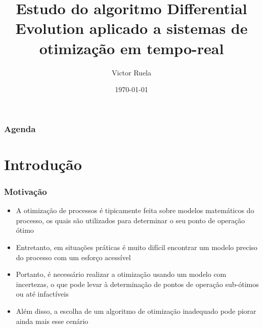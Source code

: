 \documentclass{beamer}
\title[Computação Evolucionária 2020/1]{Estudo do algoritmo Differential Evolution aplicado a sistemas de otimização em tempo-real} %
\author{Victor Ruela} %
\institute[PPGEE - UFMG] %
{
Programa de Pós-Graduação em Engenharia Elétrica\\ Universidade Federal de Minas Gerais \\ %
\medskip
\textit{victorspruela@ufmg.br} %
}
\date{\today} %
\begin{document}
\begin{frame}
\titlepage %
\end{frame}

\begin{frame}
\frametitle{Agenda} %
\tableofcontents %
\end{frame}


\section{Introdução} %


\begin{frame}
	\frametitle{Motivação}
	\begin{itemize}
		\item A otimização de processos é tipicamente feita sobre modelos matemáticos do processo, os quais são utilizados para determinar o seu ponto de operação ótimo
		\item Entretanto, em situações práticas é muito difícil encontrar um modelo preciso do processo com um esforço acessível \cite{chachuat2009}
		\item Portanto, é necessário realizar a otimização usando um modelo com incertezas, o que pode levar à determinação de pontos de operação sub-ótimos ou até infactíveis
		\item Além disso, a escolha de um algoritmo de otimização inadequado pode piorar ainda mais esse cenário  \cite{quelhas2013}
	\end{itemize}
\end{frame}
\end{document}
